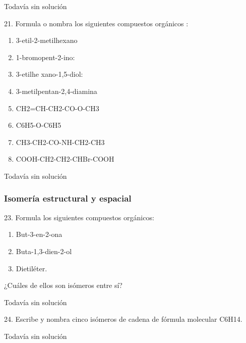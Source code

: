 \documentclass{article}
\begin{document}
\begin{solution}[print=false]
  Todavía sin solución
\end{solution}

\begin{exercise}
  21. Formula o nombra los siguientes compuestos orgánicos :
  \begin{enumerate}
    \item 3-etil-2-metilhexano
    \item 1-bromopent-2-ino:
    \item 3-etilhe xano-1,5-diol:
    \item 3-metilpentan-2,4-diamina
    \item CH2=CH-CH2-CO-O-CH3
    \item C6H5-O-C6H5
    \item CH3-CH2-CO-NH-CH2-CH3
    \item COOH-CH2-CH2-CHBr-COOH
  \end{enumerate}
\end{exercise}

\begin{solution}[print=false]
  Todavía sin solución
\end{solution}

\subsubsection{Isomería estructural y espacial}

\begin{exercise}
  23. Formula los siguientes compuestos orgánicos:
  \begin{enumerate}
    \item But-3-en-2-ona
    \item Buta-1,3-dien-2-ol
    \item Dietiléter.
  \end{enumerate}
  ¿Cuáles de ellos son isómeros entre sí?
\end{exercise}

\begin{solution}[print=false]
  Todavía sin solución
\end{solution}

\begin{exercise}
  24. Escribe y nombra cinco isómeros de cadena de fórmula molecular C6H14.
\end{exercise}

\begin{solution}[print=false]
  Todavía sin solución
\end{solution}
\end{document}
